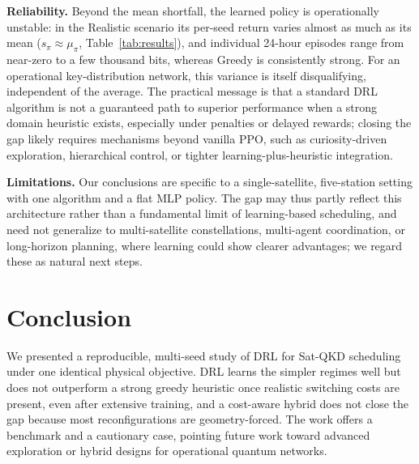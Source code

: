 \documentclass[manuscript, review, nonacm]{acmart}
\begin{document}
\textbf{Reliability.} Beyond the mean shortfall, the learned policy is operationally unstable: in the Realistic scenario its per-seed return varies almost as much as its mean ($s_\pi \approx \mu_\pi$, Table~\ref{tab:results}), and individual 24-hour episodes range from near-zero to a few thousand bits, whereas Greedy is consistently strong. For an operational key-distribution network, this variance is itself disqualifying, independent of the average. The practical message is that a standard DRL algorithm is not a guaranteed path to superior performance when a strong domain heuristic exists, especially under penalties or delayed rewards; closing the gap likely requires mechanisms beyond vanilla PPO, such as curiosity-driven exploration, hierarchical control, or tighter learning-plus-heuristic integration.

\textbf{Limitations.} Our conclusions are specific to a single-satellite, five-station setting with one algorithm and a flat MLP policy. The gap may thus partly reflect this architecture rather than a fundamental limit of learning-based scheduling, and need not generalize to multi-satellite constellations, multi-agent coordination, or long-horizon planning, where learning could show clearer advantages; we regard these as natural next steps.

\section{Conclusion}\label{sec:conclusion}
We presented a reproducible, multi-seed study of DRL for Sat-QKD scheduling under one identical physical objective. DRL learns the simpler regimes well but does not outperform a strong greedy heuristic once realistic switching costs are present, even after extensive training, and a cost-aware hybrid does not close the gap because most reconfigurations are geometry-forced. The work offers a benchmark and a cautionary case, pointing future work toward advanced exploration or hybrid designs for operational quantum networks.



\end{document}
